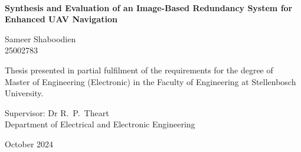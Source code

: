 \graphicspath{{frontmatter/fig/}}

\begin{titlepage}
	\begin{center}
		
		
		
		~\vspace{4.5em}
		
		{\sffamily \bfseries \huge Synthesis and Evaluation of an Image-Based Redundancy System for Enhanced UAV Navigation \par}
		
		\vspace{7em}
		
		{\large {\Large  Sameer Shaboodien} \\ 25002783 \par}
		
		\vspace{8em}
		
		{\large Thesis presented in partial fulfilment of the requirements for the degree of \\ Master of Engineering (Electronic) in the Faculty of Engineering at Stellenbosch University. \par}
		
		\vfill
		
		{\large {Supervisor}: Dr R.\ P.\ Theart\\
		Department of Electrical and Electronic Engineering \par}
		
		\vspace{10em}
		
		{\Large October 2024}
	\end{center}
\end{titlepage}
